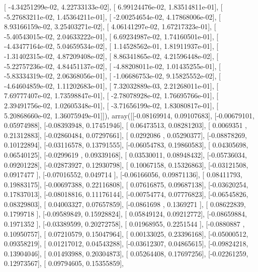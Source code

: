 \documentclass{article}
\begin{document}
       [ -4.34251299e-02,   4.22733133e-02],
       [  6.99124476e-02,   1.83514811e-01],
       [ -5.27683211e-02,   1.45364211e-01],
       [ -2.00254654e-02,   4.17868006e-02],
       [  8.93166159e-02,   3.25403271e-02],
       [  4.06141297e-02,   1.67217323e-01],
       [ -5.40543015e-02,   2.04633222e-01],
       [  6.69234987e-02,   1.74160501e-01],
       [ -4.43477164e-02,   5.04659534e-02],
       [  1.14528562e-01,   1.81911937e-01],
       [ -1.31402315e-02,   4.87209408e-02],
       [  8.86341865e-02,   4.21596448e-02],
       [ -5.22757236e-02,   4.84451137e-02],
       [ -4.88208011e-02,   1.01435255e-01],
       [ -5.83334319e-02,   2.06368056e-01],
       [ -1.06686753e-02,   9.15825552e-02],
       [ -4.64604859e-02,   1.11202683e-01],
       [  7.32032889e-03,   2.21268011e-01],
       [  7.69777407e-02,   1.73598847e-01],
       [ -2.78078928e-02,   1.76695766e-01],
       [  2.39491756e-02,   1.02605348e-01],
       [ -3.71656199e-02,   1.83080817e-01],
       [  5.20868660e-02,   1.36075949e-01]]), array([[-0.08169914,  0.09107683],
       [-0.00679101,  0.05974988],
       [-0.08393948,  0.17451946],
       [ 0.06473513,  0.08281203],
       [ 0.0069351 ,  0.21312883],
       [-0.02860484,  0.07297661],
       [ 0.0292086 ,  0.05290377],
       [-0.08878269,  0.10122894],
       [-0.03116578,  0.13791555],
       [-0.06054783,  0.19860583],
       [ 0.04305698,  0.06540125],
       [-0.0299619 ,  0.09339168],
       [ 0.03530011,  0.08948432],
       [-0.05736034,  0.09201228],
       [-0.02873927,  0.12930798],
       [ 0.10067158,  0.15326863],
       [-0.03121508,  0.0917477 ],
       [-0.07016552,  0.049714  ],
       [-0.06166056,  0.09871136],
       [ 0.08411793,  0.19883175],
       [-0.00697388,  0.22116808],
       [ 0.07616875,  0.09687138],
       [-0.03620254,  0.17837013],
       [-0.08018816,  0.11176144],
       [-0.00754774,  0.07776823],
       [-0.06545826,  0.08329803],
       [ 0.04003327,  0.07657859],
       [-0.0861698 ,  0.1369271 ],
       [ 0.08622839,  0.1799718 ],
       [-0.09589849,  0.15928824],
       [ 0.05849124,  0.09212772],
       [-0.08659884,  0.1971352 ],
       [-0.03389599,  0.20272758],
       [ 0.01968955,  0.2251544 ],
       [-0.0880887 ,  0.10950757],
       [ 0.07210579,  0.15047964],
       [ 0.00133025,  0.23396168],
       [-0.05000512,  0.09358219],
       [ 0.01217012,  0.04543288],
       [-0.03612307,  0.04865615],
       [-0.09824218,  0.13904046],
       [ 0.01493988,  0.20304873],
       [ 0.05264408,  0.17697256],
       [-0.02261259,  0.12973567],
       [ 0.09794605,  0.15355859],
\end{document}
